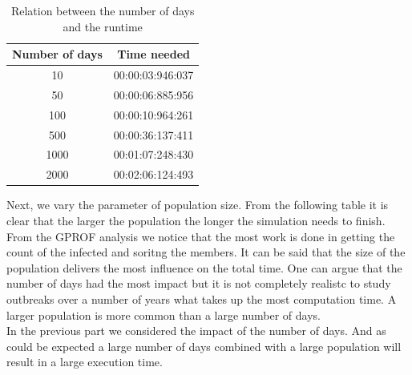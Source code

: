\documentclass[runningheads]{llncs}
\begin{document}
\begin{table}
\caption{Relation between the number of days and the runtime}
\begin{center}
	\begin{tabular}{ | c | c |}
	\hline
	Number of days & Time needed \\ \hline
	10 & 00:00:03:946:037 \\ \hline
	50 & 00:00:06:885:956 \\ \hline
	100 & 00:00:10:964:261 \\ \hline
	500 & 00:00:36:137:411 \\ \hline
	1000 & 00:01:07:248:430 \\ \hline
	2000 & 00:02:06:124:493 \\
	\hline	
	\end{tabular}
\end{center}
\end{table}

\noindent
Next, we vary the parameter of population size. From the following table it is clear that the larger the population the longer the simulation needs to finish. From the GPROF analysis we notice that the most work is done in getting the count of the infected and soritng the members. It can be said that the size of the population delivers the most influence on the total time. One can argue that the number of days had the most impact but it is not completely realistc to study outbreaks over a number of years what takes up the most computation time. A larger population is more common than a large number of days.
\\
In the previous part we considered the impact of the number of days. And as could be expected a large number of days combined with a large population will result in a large execution time.
\end{document}
